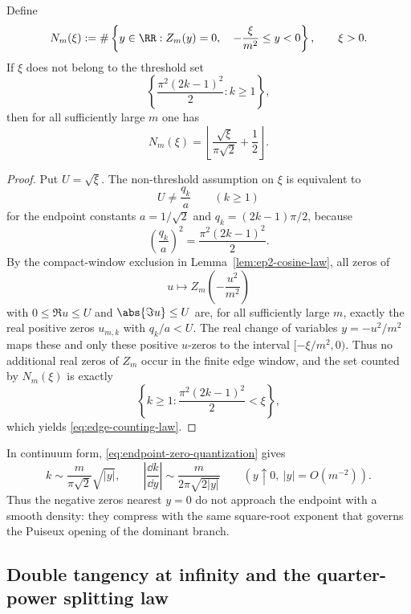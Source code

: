 \begin{corollary}\label{cor:edge-zero-counting}
Define
\[
N_m(\xi)
:=
\#\left\{
y\in\RR:
Z_m(y)=0,
\quad
-\frac{\xi}{m^2}\le y<0
\right\},
\qquad
\xi>0.
\]
If $\xi$ does not belong to the threshold set
\[
\left\{
\frac{\pi^2(2k-1)^2}{2}:k\ge1
\right\},
\]
then for all sufficiently large $m$ one has
\begin{equation}\label{eq:edge-counting-law}
N_m(\xi)
=
\left\lfloor
\frac{\sqrt{\xi}}{\pi\sqrt2}+\frac12
\right\rfloor.
\end{equation}
\end{corollary}

\begin{proof}
Put \(U=\sqrt{\xi}\).
The non-threshold assumption on \(\xi\) is equivalent to
\[
U\neq \frac{q_k}{a}
\qquad(k\ge1)
\]
for the endpoint constants \(a=1/\sqrt2\) and \(q_k=(2k-1)\pi/2\), because
\[
\left(\frac{q_k}{a}\right)^2=\frac{\pi^2(2k-1)^2}{2}.
\]
By the compact-window exclusion in Lemma~\ref{lem:ep2-cosine-law}, all zeros of
\[
u\longmapsto Z_m\!\left(-\frac{u^2}{m^2}\right)
\]
with \(0\le \Re u\le U\) and \(\abs{\Im u}\le U\) are, for all sufficiently large \(m\), exactly the real positive zeros \(u_{m,k}\) with \(q_k/a<U\).
The real change of variables \(y=-u^2/m^2\) maps these and only these positive \(u\)-zeros to the interval \([-\xi/m^2,0)\).
Thus no additional real zeros of \(Z_m\) occur in the finite edge window, and the set counted by \(N_m(\xi)\) is exactly
\[
\left\{
k\ge1:
\frac{\pi^2(2k-1)^2}{2}<\xi
\right\},
\]
which yields \eqref{eq:edge-counting-law}.
\end{proof}

In continuum form, \eqref{eq:endpoint-zero-quantization} gives
\[
k \sim \frac{m}{\pi\sqrt2}\sqrt{|y|},
\qquad
\left|\frac{\dd k}{\dd y}\right|
\sim
\frac{m}{2\pi\sqrt{2|y|}}
\qquad
(y\uparrow 0,\ |y|=O(m^{-2})).
\]
Thus the negative zeros nearest \(y=0\) do not approach the endpoint with a smooth density: they compress with the same square-root exponent that governs the Puiseux opening of the dominant branch.

\subsection{Double tangency at infinity and the quarter-power splitting law}\label{subsec:large-y-splitting}

